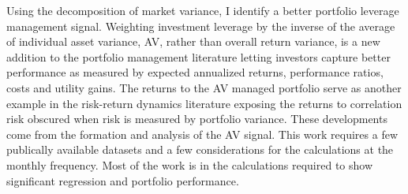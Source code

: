 
Using the decomposition of market variance, I identify a better portfolio leverage management signal. Weighting investment leverage by the inverse of the average of individual asset variance, AV, rather than overall return variance, is a new addition to the portfolio management literature letting investors capture better performance as measured by expected annualized returns, performance ratios, costs and utility gains. The returns to the AV managed portfolio serve as another example in the risk-return dynamics literature exposing the returns to correlation risk obscured when risk is measured by portfolio variance. These developments come from the formation and analysis of the AV signal. This work requires a few publically available datasets and a few considerations for the calculations at the monthly frequency. Most of the work is in the calculations required to show significant regression and portfolio performance. 